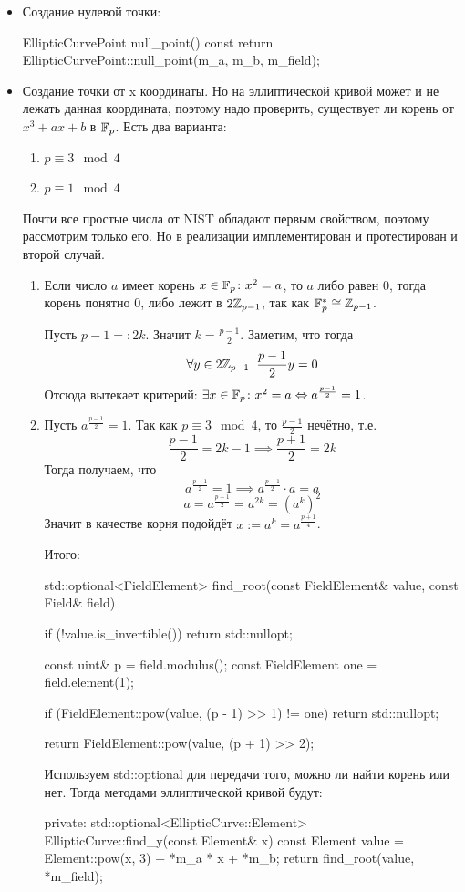 \begin{itemize}
  \item Создание нулевой точки:
  \begin{cppcode}
EllipticCurvePoint null_point() const {
    return EllipticCurvePoint::null_point(m_a, m_b, m_field);
}
  \end{cppcode}
  \item Создание точки от x координаты. Но на эллиптической кривой может и не лежать данная координата, поэтому надо проверить, существует ли корень от $x^3 + ax + b$ в $\mathbb F_p$. Есть два варианта:
  \begin{enumerate}
    \item $p\equiv 3\mod 4$
    \item $p\equiv 1\mod 4$
  \end{enumerate}
  Почти все простые числа от NIST обладают первым свойством, поэтому рассмотрим только его. Но в реализации имплементирован и протестирован и второй случай.
  \begin{enumerate}
    \item Если число $a$ имеет корень $x\in\mathbb F_p\colon x^2 = a$, то $a$ либо равен 0, тогда корень понятно 0, либо лежит в $2\mathbb Z_{p - 1}$, так как $\mathbb F_p^*\cong \mathbb Z_{p-1}$.

  Пусть $p - 1=: 2k$. Значит $k = \frac{p-1}{2}$. Заметим, что тогда 
  \[\forall y \in 2\mathbb Z_{p - 1}\hspace{0.2cm} \frac{p-1}{2}y = 0\] 
  Отсюда вытекает критерий: $\exists x\in\mathbb F_p\colon x^2 = a \Leftrightarrow a^{\frac{p-1}{2}} = 1$.
    \item Пусть $a^{\frac{p-1}{2}} = 1$. Так как $p\equiv 3\mod 4$, то $\frac{p-1}{2}$ нечётно, т.е.
    \[\frac{p-1}{2} = 2k - 1\implies \frac{p+1}{2} = 2k\]
    Тогда получаем, что
    \[a^{\frac{p-1}{2}} = 1\implies a^{\frac{p-1}{2}}\cdot a = a\]
    \[a = a^{\frac{p+1}{2}} = a^{2k}=(a^k)^2\]
    Значит в качестве корня подойдёт $x:= a^k = a^{\frac{p+1}{4}}$.

    Итого:
    \begin{cppcode}
std::optional<FieldElement> find_root(const FieldElement& value, const Field& field) {
    if (!value.is_invertible()) {
        return std::nullopt;
    }

    const uint& p = field.modulus();
    const FieldElement one = field.element(1);

    if (FieldElement::pow(value, (p - 1) >> 1) != one) {
        return std::nullopt;
    }

    return FieldElement::pow(value, (p + 1) >> 2);
}
    \end{cppcode}
    Используем std::optional для передачи того, можно ли найти корень или нет. Тогда методами эллиптической кривой будут:
    \begin{cppcode}
private:
std::optional<EllipticCurve::Element> EllipticCurve::find_y(const Element& x) const {
    Element value = Element::pow(x, 3) + *m_a * x + *m_b;
    return find_root(value, *m_field);
}


\end{cppcode}
\end{enumerate}
\end{itemize}
